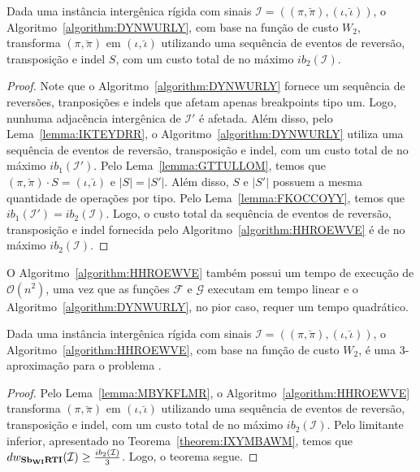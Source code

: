 \begin{lemma}\label{lemma:MBYKFLMR}
Dada uma instância intergênica rígida com sinais $\mathcal{I}=((\pi,\breve\pi),(\iota,\breve\iota))$, o Algoritmo~\ref{algorithm:DYNWURLY}, com base na função de custo $W_2$, transforma $(\pi,\breve\pi)$ em $(\iota,\breve\iota)$ utilizando uma sequência de eventos de reversão, transposição e indel $S$, com um custo total de no máximo $ib_2(\mathcal{I})$.
\end{lemma}
\begin{proof}
Note que o Algoritmo~\ref{algorithm:DYNWURLY} fornece um sequência de reversões, tranposições e indels que afetam apenas breakpoints tipo um. Logo, nunhuma adjacência intergênica de $\mathcal{I'}$ é afetada. Além disso, pelo Lema~\ref{lemma:IKTEYDRR}, o Algoritmo~\ref{algorithm:DYNWURLY} utiliza uma sequência de eventos de reversão, transposição e indel, com um custo total de no máximo $ib_1(\mathcal{I'})$. Pelo Lema~\ref{lemma:GTTULLOM}, temos que $(\pi,\breve\pi) \cdot S = (\iota,\breve\iota)$ e $|S| = |S'|$. Além disso, $S$ e $|S'|$ possuem a mesma quantidade de operações por tipo. Pelo Lema~\ref{lemma:FKOCCOYY}, temos que $ib_1(\mathcal{I'}) = ib_2(\mathcal{I})$. Logo, o custo total da sequência de eventos de reversão, transposição e indel fornecida pelo Algoritmo~\ref{algorithm:HHROEWVE} é de no máximo $ib_2(\mathcal{I})$.
\end{proof}

O Algoritmo~\ref{algorithm:HHROEWVE} também possui um tempo de execução de $\mathcal{O}(n^2)$, uma vez que as funções $\mathcal{F}$ e $\mathcal{G}$ executam em tempo linear e o Algoritmo~\ref{algorithm:DYNWURLY}, no pior caso, requer um tempo quadrático.

\begin{theorem}\label{theorem:MJXOZGOO}
Dada uma instância intergênica rígida com sinais $\mathcal{I}=((\pi,\breve\pi),(\iota,\breve\iota))$, o Algoritmo~\ref{algorithm:HHROEWVE}, com base na função de custo $W_2$, é uma $3$-aproximação para o problema \SbWIRTI{}.
\end{theorem}
\begin{proof}
Pelo Lema~\ref{lemma:MBYKFLMR}, o Algoritmo~\ref{algorithm:HHROEWVE} transforma $(\pi,\breve\pi)$ em $(\iota,\breve\iota)$ utilizando uma sequência de eventos de reversão, transposição e indel, com um custo total de no máximo $ib_2(\mathcal{I})$. Pelo limitante inferior, apresentado no Teorema~\ref{theorem:IXYMBAWM}, temos que $dw_{\textbf{Sb\textsubscript{WI}RTI}}(\mathcal{I}) \ge \frac{ib_2(\mathcal{I})}{3}$. Logo, o teorema segue.
\end{proof}

